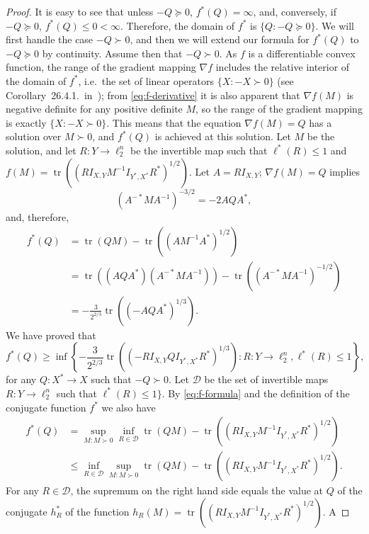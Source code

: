 \documentclass[12pt]{article}
\DeclareMathOperator{\tr}{tr}
\begin{document}
\begin{proof}
  It is easy to see that unless $-Q \succeq 0$, $f^*(Q) = \infty$,
  and, conversely, if $-Q \succeq 0$, $f^*(Q) \le 0 <
  \infty$. Therefore, the domain of $f^*$ is $\{Q: -Q \succeq 0\}$. We
  will first handle the case $-Q \succ 0$, and then we will extend our
  formula for $f^*(Q)$ to $-Q \succeq 0$ by continuity. Assume then
  that $-Q \succ 0$. As $f$ is a differentiable convex function, the
  range of the gradient mapping $\nabla f$ includes the relative
  interior of the domain of $f^*$, i.e.~the set of linear operators
  $\{X: -X \succ 0\}$ (see Corollary~26.4.1.~in~\cite{Rockafellar});
  from \eqref{eq:f-derivative} it is also apparent that $\nabla f(M)$
  is negative definite for any positive definite $M$, so the range of
  the gradient mapping is exactly $\{X: -X \succ 0\}$. This means that
  the equation $\nabla f(M) = Q$ has a solution over $M \succ 0$, and
  $f^*(Q)$ is achieved at this solution. Let $M$ be the solution, and
  let $R:Y \to \ell_2^n$ be the invertible map such that $\ell^*(R)
  \le 1$ and $f(M) = \tr((RI_{X,Y}M^{-1}I_{Y^*,X^*}R^*)^{1/2})$. Let
  $A = RI_{X,Y}$; $\nabla f(M) = Q$ implies
  \[
  (A^{-*} M A^{-1})^{-3/2} = -2 AQA^*,
  \]
  and, therefore,
  \begin{align*}
    f^*(Q) &= \tr(QM) - \tr((AM^{-1}A^*)^{1/2})\\
    &= \tr((AQA^*)(A^{-*}MA^{-1})) -   \tr((A^{-*}MA^{-1})^{-1/2})\\
    &= -\frac{3}{2^{2/3}} \tr((-AQA^*)^{1/3}).
  \end{align*}
  We have proved that
  \begin{equation}\label{eq:conjugate-lb}
  f^*(Q) \ge 
  \inf\left\{ -\frac{3}{2^{2/3}} \tr((-RI_{X,Y}QI_{Y^*,X^*}R^*)^{1/3}):
  R:Y \to \ell_2^n,\ell^*(R) \le 1\right\},
  \end{equation}
  for any $Q:X^*\to X$ such that $-Q \succ 0$.  Let $\mathcal{D}$ be
  the set of invertible maps $R:Y \to \ell_2^n$ such that $\ell^*(R)
  \le 1\}$. By \eqref{eq:f-formula} and the definition of the
  conjugate function $f^*$ we also have
  \begin{align*}
  f^*(Q) &= 
  \sup_{M: M \succ 0} 
  \inf_{R \in \mathcal{D}}
  \tr(QM) - \tr((RI_{X,Y}M^{-1}I_{Y^*,X^*}R^*)^{1/2})\\
  &\le
  \inf_{R \in \mathcal{D}}
  \sup_{M: M \succ 0} 
  \tr(QM) - \tr((RI_{X,Y}M^{-1}I_{Y^*,X^*}R^*)^{1/2}).
  \end{align*}
  For any $R \in \mathcal{D}$, the supremum on the right hand side
  equals the value at $Q$ of the conjugate $h^*_R$ of the
  function $h_R(M) = \tr((RI_{X,Y}M^{-1}I_{Y^*,X^*}R^*)^{1/2})$. A

\end{proof}
\end{document}
